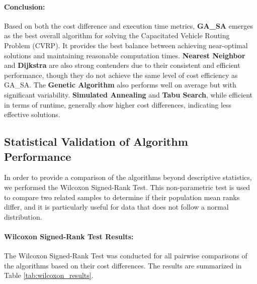 \documentclass{article}
\begin{document}
    \paragraph{Conclusion:}
    Based on both the cost difference and execution time metrics, \textbf{GA\_SA} emerges as the best overall algorithm for solving the Capacitated Vehicle Routing Problem (CVRP). It provides the best balance between achieving near-optimal solutions and maintaining reasonable computation times. \textbf{Nearest Neighbor} and \textbf{Dijkstra} are also strong contenders due to their consistent and efficient performance, though they do not achieve the same level of cost efficiency as GA\_SA. The \textbf{Genetic Algorithm} also performs well on average but with significant variability. \textbf{Simulated Annealing} and \textbf{Tabu Search}, while efficient in terms of runtime, generally show higher cost differences, indicating less effective solutions.

    \subsection{Statistical Validation of Algorithm Performance}

    In order to provide a comparison of the algorithms beyond descriptive statistics, we performed the Wilcoxon Signed-Rank Test. This non-parametric test is used to compare two related samples to determine if their population mean ranks differ, and it is particularly useful for data that does not follow a normal distribution.

    \paragraph{Wilcoxon Signed-Rank Test Results:}
    The Wilcoxon Signed-Rank Test was conducted for all pairwise comparisons of the algorithms based on their cost differences. The results are summarized in Table \ref{tab:wilcoxon_results}.
\end{document}
